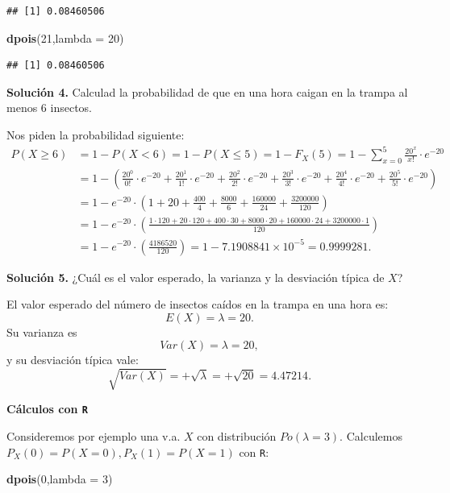 \documentclass[]{book}
\newenvironment{Shaded}{\begin{snugshade}}{\end{snugshade}}
\newcommand{\DataTypeTok}[1]{\textcolor[rgb]{0.13,0.29,0.53}{#1}}
\newcommand{\DecValTok}[1]{\textcolor[rgb]{0.00,0.00,0.81}{#1}}
\newcommand{\KeywordTok}[1]{\textcolor[rgb]{0.13,0.29,0.53}{\textbf{#1}}}
\newcommand{\NormalTok}[1]{#1}
\begin{document}
\begin{verbatim}
## [1] 0.08460506
\end{verbatim}

\begin{Shaded}
\begin{Highlighting}[]
\KeywordTok{dpois}\NormalTok{(}\DecValTok{21}\NormalTok{,}\DataTypeTok{lambda =} \DecValTok{20}\NormalTok{)}
\end{Highlighting}
\end{Shaded}

\begin{verbatim}
## [1] 0.08460506
\end{verbatim}

\textbf{Solución 4.} Calculad la probabilidad de que en una hora caigan en la trampa al menos 6 insectos.

Nos piden la probabilidad siguiente:
\[
\begin{array}{rl}
 P(X\geq 6)&=1- P(X<6)=1-P(X\leq 5)=1-F_X(5)=1-\displaystyle\sum_{x=0}^{5} \frac{20^{x}}{x!}\cdot e^{-20}\\
 &=
 1-\left(\frac{20^{0}}{0!}\cdot e^{-20}+\frac{20^{1}}{1!}\cdot e^{-20}+\frac{20^{2}}{2!}\cdot e^{-20}+\frac{20^{3}}{3!}\cdot e^{-20}+\frac{20^{4}}{4!}\cdot e^{-20}+\frac{20^{5}}{5!}\cdot e^{-20}\right)\\[1ex]
 &=
 1-e^{-20}\cdot \left(1+20+\frac{400}{4}+\frac{8000}{6}+\frac{160000}{24}+\frac{3200000}{120}\right)\\[1ex]
 &=
 1-e^{-20} \cdot \left(\frac{1 \cdot 120+20\cdot 120+400\cdot 30+8000\cdot 20+160000\cdot 24+3200000\cdot 1}{120}\right)\\[1ex]
 &= 1-e^{-20}\cdot\left(\frac{4186520}{120}\right)=1-\ensuremath{7.1908841\times 10^{-5}} =0.9999281.
\end{array}
\]

\textbf{Solución 5.} ¿Cuál es el valor esperado, la varianza y la desviación típica de \(X\)?

El valor esperado del número de insectos caídos en la trampa en una hora es:
\[E(X)=\lambda=20.\]
Su varianza es
\[Var(X)=\lambda=20,\]
y su desviación típica vale:
\[\sqrt{Var(X)}=+\sqrt{\lambda}=+\sqrt{20}=4.47214.\]

\textbf{Cálculos con \texttt{R}}

Consideremos por ejemplo una v.a. \(X\) con distribución \(Po(\lambda=3)\). Calculemos \(P_X(0)=P(X=0), P_X(1)=P(X=1)\) con \texttt{R}:

\begin{Shaded}
\begin{Highlighting}[]
\KeywordTok{dpois}\NormalTok{(}\DecValTok{0}\NormalTok{,}\DataTypeTok{lambda =} \DecValTok{3}\NormalTok{)}
\end{Highlighting}
\end{Shaded}
\end{document}
